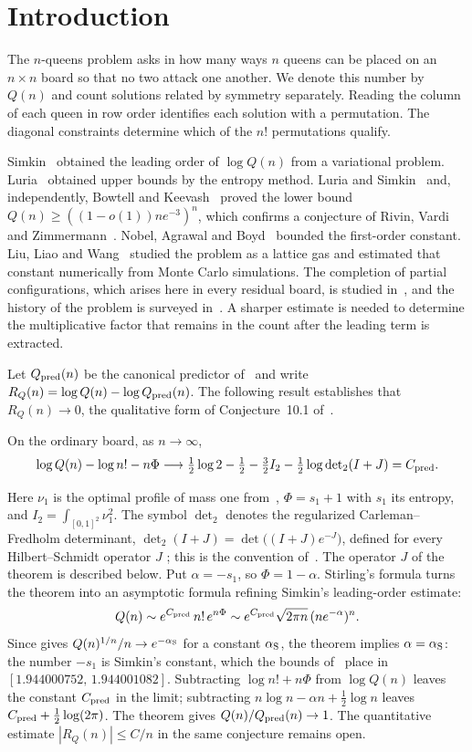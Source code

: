 \section{Introduction}
The $n$-queens problem asks in how many ways $n$ queens can be placed on an $n\times n$ board so
that no two attack one another. We denote this number by $Q(n)$ and count solutions related by
symmetry separately. Reading the column of each queen in row order identifies each solution with a
permutation. The diagonal constraints determine which of the $n!$ permutations qualify.

Simkin~\cite[Theorem~1.1]{simkin} obtained the leading order of $\log Q(n)$ from a variational
problem. Luria~\cite{luria} obtained upper bounds by the entropy method. Luria and
Simkin~\cite{ls} and, independently, Bowtell and Keevash~\cite{bk} proved the lower bound
$Q(n)\ge((1-o(1))ne^{-3})^n$, which confirms a conjecture of Rivin, Vardi and
Zimmermann~\cite{rvz}. Nobel, Agrawal and Boyd~\cite{nab} bounded the first-order constant.
Liu, Liao and Wang~\cite{llw} studied the problem as a lattice gas and estimated that constant
numerically from Monte Carlo simulations. The
completion of partial configurations, which arises here in every residual board, is studied
in~\cite{gms}, and the history of the problem is surveyed in~\cite{bs}. A sharper estimate is
needed to determine the multiplicative factor that remains in the count after the leading term is
extracted.

Let $Q_{\rm pred}(n)$ be the canonical predictor of~\cite{pred} and write
$R_Q(n)=\log Q(n)-\log Q_{\rm pred}(n)$. The following result establishes that $R_Q(n)\to0$, the
qualitative form of Conjecture~10.1 of~\cite{pred}.
\begin{teorema}\label{princ}
On the ordinary board, as $n\to\infty$,
\[
 \log Q(n)-\log n!-n\Phi\longrightarrow
 \tfrac12\log2-\tfrac12-\tfrac32 I_2-\tfrac12\log{\det}_2(I+J)=C_{\rm pred}.
\]
\end{teorema}
Here $\nu_1$ is the optimal profile of mass one from~\cite{perfil}, $\Phi=s_1+1$ with $s_1$ its
entropy, and $I_2=\int_{[0,1]^2}\nu_1^2$. The symbol ${\det}_2$ denotes the regularized
Carleman--Fredholm determinant, ${\det}_2(I+J)=\det\bigl((I+J)e^{-J}\bigr)$, defined for every
Hilbert--Schmidt operator $J$ \cite[Chapter~9]{simon}; this is the convention
of~\cite[(D4.1)]{pred}. The operator $J$ of the theorem is described below.
Put $\alpha=-s_1$, so $\Phi=1-\alpha$. Stirling's formula
turns the theorem into an asymptotic formula refining Simkin's leading-order estimate:
\[
 Q(n)\sim e^{C_{\rm pred}}\,n!\,e^{n\Phi}
      \sim e^{C_{\rm pred}}\sqrt{2\pi n}\,(n e^{-\alpha})^n .
\]
Since \cite[Theorem~1.1]{simkin} gives $Q(n)^{1/n}/n\to e^{-\alpha_{\rm S}}$ for a constant
$\alpha_{\rm S}$, the theorem implies $\alpha=\alpha_{\rm S}$: the number $-s_1$ is Simkin's
constant, which the bounds of~\cite{nab} place in $[1.944000752,\,1.944001082]$.
Subtracting $\log n!+n\Phi$ from $\log Q(n)$ leaves the constant $C_{\rm pred}$ in the limit;
subtracting $n\log n-\alpha n+\tfrac12\log n$ leaves $C_{\rm pred}+\tfrac12\log(2\pi)$.
The theorem gives $Q(n)/Q_{\rm pred}(n)\to1$. The quantitative estimate $|R_Q(n)|\le C/n$
in the same conjecture remains open.

